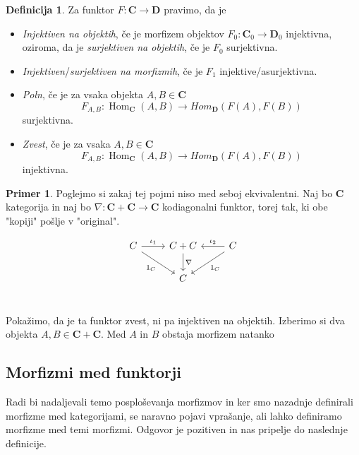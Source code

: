 \documentclass[12pt,a4paper]{book}
\theoremstyle{definition}
\newtheorem{definicija}{Definicija}[chapter]
\theoremstyle{plain}
\theoremstyle{definition}
\newtheorem{primer}{Primer}[section]
\theoremstyle{remark}
\newcommand{\cat}[1]{\textbf{#1}}
\DeclareMathOperator{\Hom}{Hom}
\begin{document}
\begin{definicija}
Za funktor $F : \cat{C} \to \cat{D}$ pravimo, da je 
\begin{itemize}
\item \emph{Injektiven na objektih}, če je morfizem objektov $F_0 : \cat{C}_0 \to \cat{D}_0$ injektivna, oziroma, da je \emph{surjektiven na objektih}, če je $F_0$ surjektivna.
\item \emph{Injektiven}/\emph{surjektiven na morfizmih}, če je $F_1$ injektive/asurjektivna.
\item \emph{Poln}, če je za vsaka objekta $A,B \in \cat{C}$
$$F_{A,B} : \Hom_{\cat{C}}(A,B) \to Hom_{\cat{D}}(F(A),F(B))$$
surjektivna.
\item \emph{Zvest}, če je za vsaka $A,B \in \cat{C}$
$$F_{A,B} : \Hom_{\cat{C}}(A,B) \to Hom_{\cat{D}}(F(A),F(B))$$
injektivna.
\end{itemize}
\end{definicija}

\begin{primer}
Poglejmo si zakaj tej pojmi niso med seboj ekvivalentni. Naj bo $\cat{C}$ kategorija in naj bo $\nabla : \cat{C} + \cat{C} \to \cat{C}$ kodiagonalni funktor, torej tak, ki obe "kopiji" pošlje v "original".

$$\begin{tikzcd}[column sep=normal]
C \ar[r, "\iota_1"] \ar[dr, "1_C"'] & C + C \ar[d, "\nabla"] & C \ar[l, "\iota_2"'] \ar[dl, "1_C"] \\
& C & \\
\end{tikzcd}$$

Pokažimo, da je ta funktor zvest, ni pa injektiven na objektih. Izberimo si dva objekta $A,B \in \cat{C} + \cat{C}$. Med $A$ in $B$ obstaja morfizem natanko 

\end{primer}

\subsection{Morfizmi med funktorji}
Radi bi nadaljevali temo posploševanja morfizmov in ker smo nazadnje definirali morfizme med kategorijami, se naravno pojavi vprašanje, ali lahko definiramo morfizme med temi morfizmi. Odgovor je pozitiven in nas pripelje do naslednje definicije.
\end{document}
